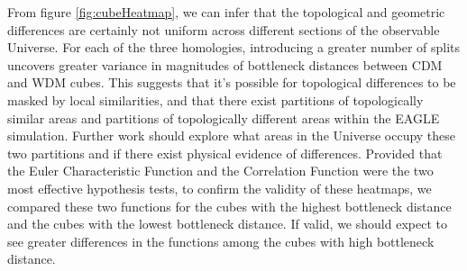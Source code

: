 \documentclass[12pt]{article}
\begin{document}
From figure \ref{fig:cubeHeatmap}, we can infer that the topological and geometric differences are certainly not uniform across different sections of the observable Universe. For each of the three homologies, introducing a greater number of splits uncovers greater variance in magnitudes of bottleneck distances between CDM and WDM cubes. This suggests that it's possible for topological differences to be masked by local similarities, and that there exist partitions of topologically similar areas and partitions of topologically different areas within the EAGLE simulation. Further work should explore what areas in the Universe occupy these two partitions and if there exist physical evidence of differences. Provided that the Euler Characteristic Function and the Correlation Function were the two most effective hypothesis tests, to confirm the validity of these heatmaps, we compared these two functions for the cubes with the highest bottleneck distance and the cubes with the lowest bottleneck distance. If valid, we should expect to see greater differences in the functions among the cubes with high bottleneck distance.
\end{document}
